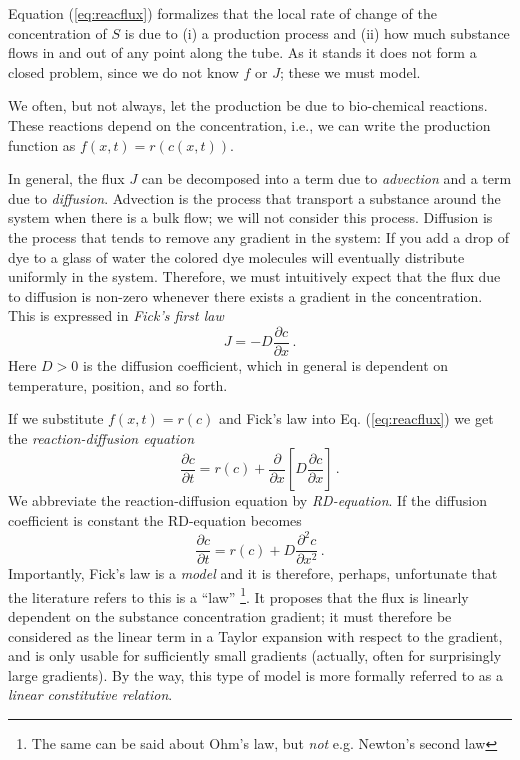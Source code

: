 Equation (\ref{eq:reacflux}) formalizes that the local rate of change of
the concentration of $S$ is due to (i) a production process and (ii) how much
substance flows in and out of any point along the tube. As it stands it does not
form a closed problem, since we do not know $f$ or $J$; these we must model.

We often, but not always, let the production be due to bio-chemical reactions. These reactions depend on the 
concentration, i.e., we can write the production function as $f(x,t) = r(c(x,t))$. 

In general, the flux $J$ can be decomposed into a term due to \emph{advection} and a
term due to \emph{diffusion}. Advection is the process that transport a substance
around the system when there is a bulk flow; we will not consider this process. 
Diffusion is the process that tends to remove any gradient in the system:
If you add a drop of dye to a glass of water the colored dye molecules will
eventually distribute uniformly in the system. Therefore, we must intuitively
expect that the flux due to diffusion is non-zero whenever there exists a
gradient in the concentration. This is expressed in \emph{Fick's first law}
\begin{equation}
	J = -D\frac{\partial c}{\partial x} \, .
\end{equation}
Here $D > 0$ is the diffusion coefficient, which in general is dependent on
temperature, position, and so forth.

If we substitute $f(x,t)=r(c)$ and Fick's law into Eq. (\ref{eq:reacflux}) we
get the \emph{reaction-diffusion equation}
\begin{equation}
	\label{eq:reacfdif0}
	\frac{\partial c}{\partial t}= r(c) + \frac{\partial}{\partial
	x}\left[D\frac{\partial c}{\partial x} \right] \, . 
\end{equation}
We abbreviate the reaction-diffusion equation by \emph{RD-equation}. If the
diffusion coefficient is constant the RD-equation becomes
\begin{equation}
	\label{eq:reacfdif1}
	\frac{\partial c}{\partial t}= r(c) + D\frac{\partial^2 c}{\partial
	x^2} \, . 
\end{equation}
Importantly, Fick's law is a \emph{model} and it is therefore, perhaps, unfortunate that
the literature refers to this is a ``law'' \footnote{The same can be said about
Ohm's law, but \emph{not} e.g. Newton's second law}. It proposes that the flux
is linearly dependent on the substance concentration gradient; it must therefore
be considered as the linear term in a Taylor expansion with respect to the gradient, 
and is only usable for sufficiently small gradients (actually, often for surprisingly large
gradients). By the way, this type of model is more formally referred to as a 
\emph{linear constitutive relation}.

